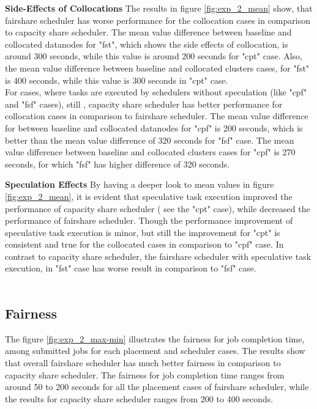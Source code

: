 \textbf{Side-Effects of Collocations } The results in figure \ref{fig:exp_2_mean} show, that fairshare scheduler has worse performance for the collocation cases in comparison to capacity share scheduler. The mean value difference between baseline and collocated datanodes for "fst", which shows the side effects of collocation, is around 300 seconds, while this value is around 200 seconds for "cpt" case. Also, the mean value difference between baseline and collocated clusters cases, for "fst" is 400 seconds, while this value is 300 seconds in "cpt" case.\\ 

For cases, where tasks are executed by schedulers without speculation (like "cpf" and "fsf" cases), still , capacity share scheduler has better performance for collocation cases in comparison to fairshare scheduler. The mean value difference for between baseline and collocated datanodes for "cpf" is 200 seconds, which is better than the mean value difference of 320 seconds for "fsf" case. The mean value difference between baseline and collocated clusters cases for "cpf" is 270 seconds, for which "fsf" has higher difference of 320 seconds. 


\textbf{Speculation Effects } By having a deeper look to mean values in figure \ref{fig:exp_2_mean}, it is evident that speculative task execution improved the performance of capacity share scheduler ( see the "cpt" case), while decreased the performance of fairshare scheduler. Though the performance improvement of speculative task execution is minor, but still the improvement for "cpt"‌ is consistent and true for the collocated cases in comparison to "cpf" case. In contrast to capacity share scheduler, the  fairshare scheduler with speculative task execution, in "fst" case has worse result in comparison to "fsf" case. \\  ‌  


 \subsection{Fairness}
 The figure \ref{fig:exp_2_max-min} illustrates the fairness for job completion time, among submitted jobs for each placement and scheduler cases. The results show that overall fairshare scheduler has much better fairness in comparison to capacity share scheduler. The fairness for job completion time ranges from around 50 to 200 seconds for all the placement cases of fairshare scheduler, while the results for capacity share scheduler ranges from 200 to 400 seconds.\\ 
 
